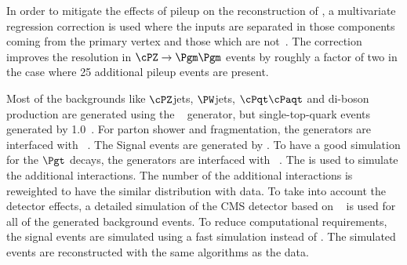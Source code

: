 In order to mitigate the effects of pileup on the reconstruction of \MET, a multivariate regression correction is used where the inputs are separated in those components coming from the primary vertex and those which are not~\cite{CMS-JME-12-002}.
The correction improves the \MET resolution in $\cPZ\to\Pgm\Pgm$ events by roughly a factor of two in the case where 25 additional pileup events are present.

Most of the backgrounds like $\cPZ$jets, $\PW$jets, $\cPqt\cPaqt$ and di-boson production are generated using the ~\cite{Alwall:2011uj} generator, but single-top-quark events generated by {\POWHEG} 1.0~\cite{Nason:2004rx,Frixione:2007vw,Alioli:2009je,Alioli:2010xd}.
For parton shower  and fragmentation, the generators are interfaced with ~\cite{Sjostrand:2006za}.
The Signal events are generated by  \PYTHIA. To have a good simulation for the $\Pgt$ decays, the generators are interfaced with  \TAUOLA~\cite{Davidson:2010rw}. The \PYTHIA is used to simulate the additional interactions. The number of the additional interactions is reweighted to have the similar distribution with data. To take into account the detector effects, a detailed simulation of the CMS detector based on {\GEANTfour}~\cite{Agostinelli:2002hh} is used for all of the generated background events. To reduce  computational requirements, the signal events are simulated using a fast simulation \cite{Abdullin:2011zz} instead of {\GEANTfour}. 
The simulated events are reconstructed with the same algorithms as the data.






